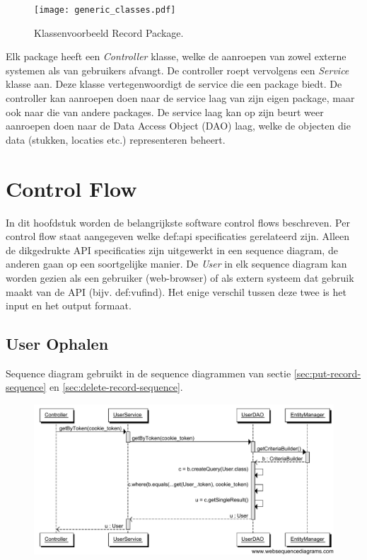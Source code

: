 \documentclass[a4paper,titlepage]{report}
\begin{document}
    \begin{figure}[H]
      \label{fig:exclasses}
      \centering
      \texttt{[image: generic\_classes.pdf]}
      \caption{Klassenvoorbeeld Record Package.}
    \end{figure}

    Elk package heeft een \emph{Controller} klasse, welke de aanroepen van zowel
    externe systemen als van gebruikers afvangt. De controller roept vervolgens
    een \emph{Service} klasse aan. Deze klasse vertegenwoordigt de service die
    een package biedt.
    De controller kan aanroepen doen naar de service laag van zijn eigen
    package, maar ook naar die van andere packages.  De service laag kan op zijn beurt
    weer aanroepen doen naar de Data Access Object (DAO) laag, welke de objecten
    die data (stukken, locaties etc.) representeren beheert.

\chapter{Control Flow}
  \label{cha:control-flow}
  In dit hoofdstuk worden de belangrijkste software control flows beschreven.
  Per control flow staat aangegeven welke \gls{def:api} specificaties gerelateerd zijn.
  Alleen de dikgedrukte API specificaties zijn uitgewerkt in een sequence
  diagram, de anderen gaan op een soortgelijke manier. De \emph{User} in elk
  sequence diagram kan worden gezien als een gebruiker (web-browser) of als
  extern systeem dat gebruik maakt van de API (bijv. \gls{def:vufind}). Het enige verschil
  tussen deze twee is het input en het output formaat.

  \section{User Ophalen}
    Sequence diagram gebruikt in de sequence diagrammen van sectie
    \ref{sec:put-record-sequence} en \ref{sec:delete-record-sequence}.
    \begin{figure}[H]
      \label{fig:fetch-user-sequence}
      \centering
      \includegraphics[width=\textwidth,trim=0 0.4cm 0
      0,clip]{fetch_user_sequence.pdf}
    \end{figure}
    \pagebreak
\end{document}
